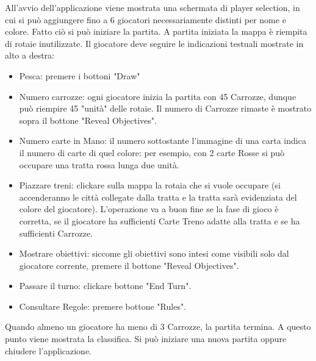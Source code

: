 \documentclass[a4paper,12pt]{report}
\begin{document}
All'avvio dell'applicazione viene mostrata una schermata di player selection, in cui si può aggiungere fino a 6 giocatori necessariamente distinti per nome e colore. Fatto ciò si può iniziare la partita.
A partita iniziata la mappa è riempita di rotaie inutilizzate. Il giocatore deve seguire le indicazioni testuali mostrate in alto a destra:
\begin{itemize}
    \item Pesca: premere i bottoni "Draw"
    \item Numero carrozze: ogni giocatore inizia la partita con 45 Carrozze, dunque può riempire 45 "unità" delle rotaie. Il numero di Carrozze rimaste è mostrato sopra il bottone "Reveal Objectives".
    \item Numero carte in Mano: il numero sottostante l'immagine di una carta indica il numero di carte di quel colore: per esempio, con 2 carte Rosse si può occupare una tratta rossa lunga due unità.
    \item Piazzare treni: clickare sulla mappa la rotaia che si vuole occupare (si accenderanno le città collegate dalla tratta e la tratta sarà evidenziata del colore del giocatore). L'operazione va a buon fine se la fase di gioco è corretta, se il giocatore ha sufficienti Carte Treno adatte alla tratta e se ha sufficienti Carrozze.
    \item Mostrare obiettivi: siccome gli obiettivi sono intesi come visibili solo dal giocatore corrente, premere il bottone "Reveal Objectives".
    \item Passare il turno: clickare bottone "End Turn".
    \item Consultare Regole: premere bottone "Rules".
\end{itemize}
Quando almeno un giocatore ha meno di 3 Carrozze, la partita termina. A questo punto viene mostrata la classifica. Si può iniziare una nuova partita oppure chiudere l'applicazione.
\end{document}
